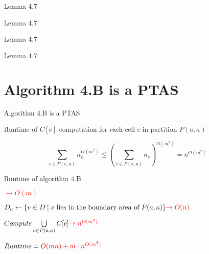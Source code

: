 \documentclass{beamer}
\begin{document}
\begin{frame}{Lemma 4.7}



\end{frame}

\begin{frame}{Lemma 4.7}



\end{frame}

\begin{frame}{Lemma 4.7}



\end{frame}

\begin{frame}{Lemma 4.7}



\end{frame}

\section{Algorithm 4.B is a PTAS}

\begin{frame}{Algorithm 4.B is a PTAS}

\begin{exampleblock}{Runtime of $C[e]$ computation for each cell $e$ in partition $P(a,a)$}

    \begin{equation}
        \sum_{e \in P(a,a)} n_e^{O(m^2)} \le \left ( \sum_{e \in P(a,a)} n_e \right ) ^{O(m^2)} = n^{O(m^2)} 
    \end{equation}
    

\end{exampleblock}

\begin{exampleblock}{Runtime of algorithm 4.B}

     \textcolor{red}{ $\xrightarrow{} O(m)$ } 

    \vspace{0.5em}
    
        \hspace{4em} $D_a \gets \{v \in D \mid v \text{ lies in the boundary area of } P(a, a)\} \textcolor{red}{  \xrightarrow{} O(n) }$ 

    \vspace{0.5em}
        
        \hspace{4em} $Compute \bigcup\limits_{e \in P(a,a)} C[e] \textcolor{red}{  \xrightarrow{} n^{O(m^2)} }$

    \vspace{2em}

        $ Runtime = \textcolor{red}{ O(mn) + m \cdot n^{O(m^2)} } $
    

\end{exampleblock}

\end{frame}
\end{document}
